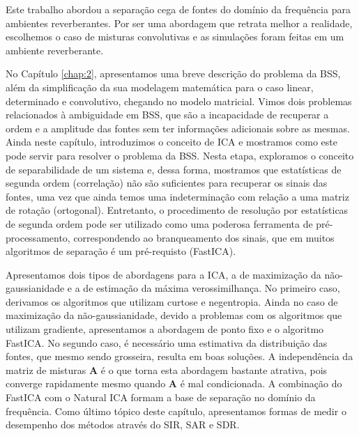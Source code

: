 \label{chap:5}
Este trabalho abordou a separação cega de fontes do domínio da frequência para ambientes reverberantes. Por ser uma abordagem que retrata melhor a realidade, escolhemos o caso de misturas convolutivas e as simulações foram feitas em um ambiente reverberante.

No Capítulo \ref{chap:2}, apresentamos uma breve descrição do problema da BSS, além da simplificação da sua modelagem matemática para o caso linear, determinado e convolutivo, chegando no modelo matricial. Vimos dois problemas relacionados à ambiguidade em BSS, que são a incapacidade de recuperar a ordem e a amplitude das fontes sem ter informações adicionais sobre as mesmas. Ainda neste capítulo, introduzimos o conceito de ICA e mostramos como este pode servir para resolver o problema da BSS. Nesta etapa, exploramos o conceito de separabilidade de um sistema e, dessa forma, mostramos que estatísticas de segunda ordem (correlação) não são suficientes para recuperar os sinais das fontes, uma vez que ainda temos uma indeterminação com relação a uma matriz de rotação (ortogonal). Entretanto, o procedimento de resolução por estatísticas de segunda ordem pode ser utilizado como uma poderosa ferramenta de pré-processamento, correspondendo ao branqueamento dos sinais, que em muitos algoritmos de separação é um pré-requisto (FastICA). 

Apresentamos dois tipos de abordagens para a ICA, a de maximização da não-gaussianidade e a de estimação da máxima verossimilhança. No primeiro caso, derivamos os algoritmos que utilizam curtose e negentropia. Ainda no caso de maximização da não-gaussianidade, devido a problemas com os algoritmos que utilizam gradiente, apresentamos a abordagem de ponto fixo e o algoritmo FastICA. No segundo caso, é necessário uma estimativa da distribuição das fontes, que mesmo sendo grosseira, resulta em boas soluções. A independência da matriz de misturas $\mathbf{A}$ é o que torna esta abordagem bastante atrativa, pois converge rapidamente mesmo quando $\mathbf{A}$ é mal condicionada. A combinação do FastICA com o Natural ICA formam a base de separação no domínio da frequência. Como último tópico deste capítulo, apresentamos formas de medir o desempenho dos métodos através do SIR, SAR e SDR.

